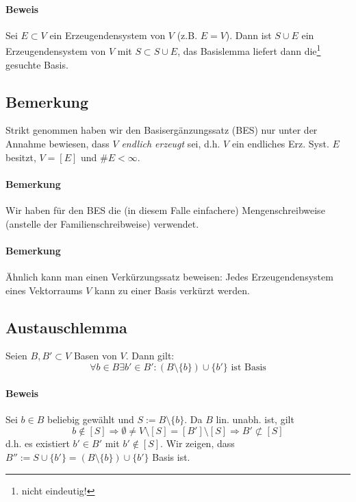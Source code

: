 \paragraph{Beweis}
    Sei $E\subset V$ ein Erzeugendensystem von $V$ (z.B. $E=V$). Dann ist $S\cup E$ ein Erzeugendensystem von $V$ mit $S\subset S\cup E$, das Basislemma liefert dann die\footnote{nicht eindeutig!} gesuchte Basis.

\subsection{Bemerkung}
    Strikt genommen haben wir den Basisergänzungssatz (BES) nur unter der Annahme bewiesen, dass $V$ \emph{endlich erzeugt} sei, d.h. $V$ ein endliches Erz. Syst. $E$ besitzt, $V=[E]$ und $\#E<\infty$.

\paragraph{Bemerkung}
    Wir haben für den BES die (in diesem Falle einfachere) Mengenschreibweise (anstelle der Familienschreibweise) verwendet.

\paragraph{Bemerkung}
    Ähnlich kann man einen Verkürzungssatz beweisen: Jedes Erzeugendensystem eines Vektorraums $V$ kann zu einer Basis verkürzt werden.

\subsection{Austauschlemma}
    \begin{Lemma}[Austauschlemma]
    	Seien $B,B' \subset V$ Basen von $V$. Dann gilt:
        \[\forall b\in B \exists b' \in B': (B\setminus\{b\})\cup\{b'\} \text{ ist Basis}\]
    \end{Lemma}
    
\paragraph{Beweis}
    Sei $b\in B$ beliebig gewählt und $S:= B\setminus \{b\}$. Da $B$ lin. unabh. ist, gilt 
        \[b\notin [S] \Rightarrow \emptyset \neq V\setminus [S] = [B']\setminus [S] \Rightarrow B' \not\subset [S]\]
    d.h. es existiert $b' \in B'$ mit $b' \notin [S]$. Wir zeigen, dass $B'' := S\cup \{b'\} = (B\setminus\{b\})\cup \{b'\}$ Basis ist.
    

